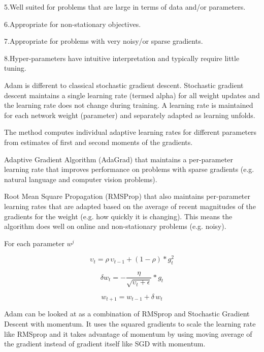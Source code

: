 \documentclass[12pt]{article}
\newcommand{\nd}{\noindent}
\begin{document}
\nd 5.Well suited for problems that are large in terms of data and/or parameters.

\nd 6.Appropriate for non-stationary objectives.

\nd 7.Appropriate for problems with very noisy/or sparse gradients.

\nd 8.Hyper-parameters have intuitive interpretation and typically require little tuning.

\nd Adam is different to classical stochastic gradient descent. Stochastic gradient descent maintains a single learning rate (termed alpha) for all weight updates and the learning rate does not change during training. A learning rate is maintained for each network weight (parameter) and separately adapted as learning unfolds. 

\nd The method computes individual adaptive learning rates for different parameters from estimates of first and second moments of the gradients.

\nd Adaptive Gradient Algorithm (AdaGrad) that maintains a per-parameter learning rate that improves performance on problems with sparse gradients (e.g. natural language and computer vision problems).

\nd Root Mean Square Propagation (RMSProp) that also maintains per-parameter learning rates that are adapted based on the average of recent magnitudes of the gradients for the weight (e.g. how quickly it is changing). This means the algorithm does well on online and non-stationary problems (e.g. noisy).

\nd For each parameter $w^j$

\begin{equation*}
\upsilon_t = \rho \, \upsilon_{t-1} + (1-\rho)* g^2_t
\end{equation*}

\begin{equation*}
\delta w_t= -\frac{\eta}{\sqrt{\upsilon_t + \epsilon}} * g_t
\end{equation*}

\begin{equation*}
w_{t+1}= w_{t-1} + \delta\,w_t
\end{equation*}

\nd Adam can be looked at as a combination of RMSprop and Stochastic Gradient Descent with momentum. It uses the squared gradients to scale the learning rate like RMSprop and it takes advantage of momentum by using moving average of the gradient instead of gradient itself like SGD with momentum.
\end{document}
